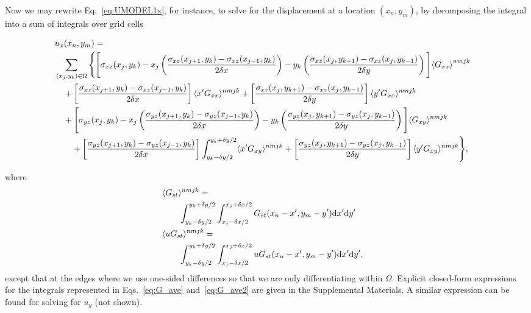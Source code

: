 \documentclass[aps,prl,reprint,twocolumn,groupedaddress,showpacs]{revtex4-1}
\def\dd{\mbox{d}}
\begin{document}
Now we may rewrite Eq.~\ref{eq:UMODEL1x}, for instance, to solve for the displacement at a location $(x_n,y_m)$, by decomposing the integral into a sum of integrals over grid cells
%
\begin{widetext}
\begin{align}
 \lefteqn{u_x(x_n,y_m) =} \nonumber\\
 & \sum_{(x_j,y_k)\in\Omega} \Bigg\{ \Bigg[\sigma_{xz}(x_j,y_k)  - x_j\left(\frac{\sigma_{xz}(x_{j+1},y_k) - \sigma_{xz}(x_{j-1},y_k) }{2\delta x }    \right)    -y_k\left( \frac{\sigma_{xz}(x_j,y_{k+1}) -  \sigma_{xz}(x_j,y_{k-1}) }{2\delta y}\right) \Bigg]{ \langle G_{xx} \rangle}^{nmjk} \nonumber \\
&\quad+\left[ \frac{\sigma_{xz}(x_{j+1},y_k) -  \sigma_{xz}(x_{j-1},y_k) }{2\delta x}   \right]\langle x'G_{xx} \rangle^{nmjk} + \left[  \frac{\sigma_{xz}(x_j,y_{k+1}) - \sigma_{xz}(x_j,y_{k-1}) }{2\delta y} \right] \langle y'G_{xx} \rangle^{nmjk}\nonumber\\
&\quad+  \Bigg[\sigma_{yz}(x_j,y_k) -x_j\left(\frac{\sigma_{yz}(x_{j+1},y_k) - \sigma_{yz}(x_{j-1},y_k) }{2\delta x}    \right)    -y_k\left( \frac{\sigma_{yz}(x_j,y_{k+1}) - \sigma_{yz}(x_j,y_{k-1}) }{2\delta y}\right) \Bigg] \langle G_{xy} \rangle^{nmjk}\nonumber \\
&\qquad +\left[ \frac{\sigma_{yz}(x_{j+1},y_k) -  \sigma_{yz}(x_{j-1},y_k) }{2\delta x}   \right]  \int_{y_k-\delta y/2}^{y_k+\delta y/2}  \langle x'G_{xy} \rangle^{nmjk} + \left[  \frac{\sigma_{yz}(x_j,y_{k+1}) - \sigma_{yz}(x_j,y_{k-1}) }{2\delta y} \right] \langle y'G_{xy} \rangle^{nmjk} \Bigg\},
\label{eq:ux_decomposed}
\end{align}
\end{widetext}
where
\begin{align}
\lefteqn{\langle G_{st} \rangle^{nmjk} = }\nonumber\\
&\qquad    \int_{y_k-\delta y/2}^{y_k+\delta y/2} \int_{x_j-\delta x/2}^{x_j+\delta x/2} G_{st}(x_n-x',y_m-y') \dd x' \dd y' \label{eq:G_ave} \\
\lefteqn{\langle uG_{st} \rangle^{nmjk} =}  \nonumber\\
&\qquad  \int_{y_k-\delta y/2}^{y_k+\delta y/2} \int_{x_j-\delta x/2}^{x_j+\delta x/2} uG_{st}(x_n-x',y_m-y') \dd x' \dd y', \label{eq:G_ave2} 
\end{align}
except that at the edges where we use one-sided differences so that we are only differentiating within $\Omega$. Explicit 
closed-form expressions for the integrals represented in Eqs.~\ref{eq:G_ave} and~\ref{eq:G_ave2} are given in the Supplemental Materials. A similar expression can be found for solving for $u_y$ (not shown).
\end{document}
